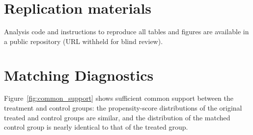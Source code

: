 \section{Replication materials}
Analysis code and instructions to reproduce all tables and figures are available in a public repository (URL withheld for blind review).

\section{Matching Diagnostics}
\label{sec:balance_plot}
Figure~\ref{fig:common_support} shows sufficient common support between the treatment and control groups: the propensity-score distributions of the original treated and control groups are similar, and the distribution of the matched control group is nearly identical to that of the treated group.

